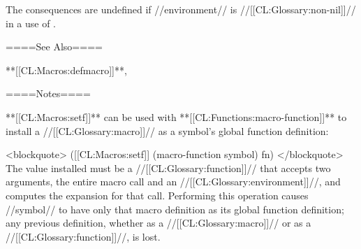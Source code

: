 The consequences are undefined if //environment// is //[[CL:Glossary:non-nil]]// in a use of .


====See Also====

**[[CL:Macros:defmacro]]**, {\secref\Evaluation}

====Notes====


**[[CL:Macros:setf]]** can be used with **[[CL:Functions:macro-function]]** to install a //[[CL:Glossary:macro]]// as a symbol's global function definition:

<blockquote> ([[CL:Macros:setf]] (macro-function symbol) fn) </blockquote> The value installed must be a //[[CL:Glossary:function]]// that accepts two arguments, the entire macro call and an //[[CL:Glossary:environment]]//, and computes the expansion for that call. Performing this operation causes //symbol// to have only that macro definition as its global function definition; any previous definition, whether as a //[[CL:Glossary:macro]]// or as a //[[CL:Glossary:function]]//, is lost.



       
